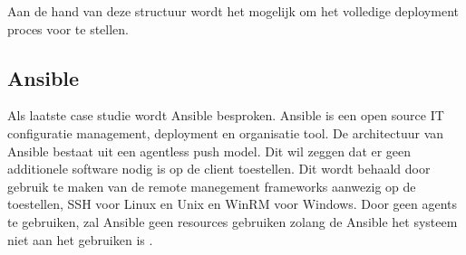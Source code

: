 Aan de hand van deze structuur wordt het mogelijk om het volledige deployment proces voor te stellen.


\subsection{Ansible}
Als laatste case studie wordt Ansible besproken.
Ansible is een open source IT configuratie management, deployment en organisatie tool.
De architectuur van Ansible bestaat uit een agentless push model.
Dit wil zeggen dat er geen additionele software nodig is op de client toestellen.
Dit wordt behaald door gebruik te maken van de remote manegement frameworks aanwezig op de toestellen, SSH voor Linux en Unix en WinRM voor Windows.
Door geen agents te gebruiken, zal Ansible geen resources gebruiken zolang de Ansible het systeem niet aan het gebruiken is \citep{ansible}.

